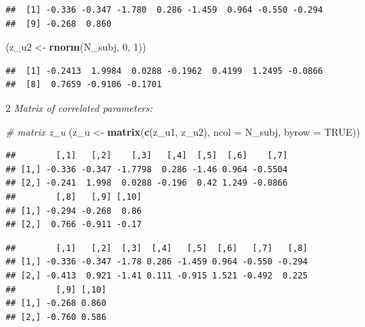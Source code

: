 \documentclass[12pt,]{krantz}
\newenvironment{Shaded}{\begin{snugshade}}{\end{snugshade}}
\newcommand{\CommentTok}[1]{\textcolor[rgb]{0.56,0.35,0.01}{\textit{#1}}}
\newcommand{\DataTypeTok}[1]{\textcolor[rgb]{0.13,0.29,0.53}{#1}}
\newcommand{\DecValTok}[1]{\textcolor[rgb]{0.00,0.00,0.81}{#1}}
\newcommand{\KeywordTok}[1]{\textcolor[rgb]{0.13,0.29,0.53}{\textbf{#1}}}
\newcommand{\NormalTok}[1]{#1}
\newcommand{\OperatorTok}[1]{\textcolor[rgb]{0.81,0.36,0.00}{\textbf{#1}}}
\newcommand{\OtherTok}[1]{\textcolor[rgb]{0.56,0.35,0.01}{#1}}
\newcommand{\StringTok}[1]{\textcolor[rgb]{0.31,0.60,0.02}{#1}}
\theoremstyle{definition}
\theoremstyle{definition}
\theoremstyle{definition}
\theoremstyle{remark}
\begin{document}
\begin{verbatim}
##  [1] -0.336 -0.347 -1.780  0.286 -1.459  0.964 -0.550 -0.294
##  [9] -0.268  0.860
\end{verbatim}

\begin{Shaded}
\begin{Highlighting}[]
\NormalTok{ (z_u2 <-}\StringTok{ }\KeywordTok{rnorm}\NormalTok{(N_subj, }\DecValTok{0}\NormalTok{, }\DecValTok{1}\NormalTok{))}
\end{Highlighting}
\end{Shaded}

\begin{verbatim}
##  [1] -0.2413  1.9984  0.0288 -0.1962  0.4199  1.2495 -0.0866
##  [8]  0.7659 -0.9106 -0.1701
\end{verbatim}

2 \emph{Matrix of correlated parameters:}

\begin{Shaded}
\begin{Highlighting}[]
\CommentTok{# matrix z_u}
\NormalTok{ (z_u <-}\StringTok{ }\KeywordTok{matrix}\NormalTok{(}\KeywordTok{c}\NormalTok{(z_u1, z_u2), }\DataTypeTok{ncol =}\NormalTok{ N_subj, }\DataTypeTok{byrow =} \OtherTok{TRUE}\NormalTok{))}
\end{Highlighting}
\end{Shaded}

\begin{verbatim}
##        [,1]   [,2]    [,3]   [,4]  [,5]  [,6]    [,7]
## [1,] -0.336 -0.347 -1.7798  0.286 -1.46 0.964 -0.5504
## [2,] -0.241  1.998  0.0288 -0.196  0.42 1.249 -0.0866
##        [,8]   [,9] [,10]
## [1,] -0.294 -0.268  0.86
## [2,]  0.766 -0.911 -0.17
\end{verbatim}

\begin{Shaded}
\end{Shaded}

\begin{verbatim}
##        [,1]   [,2]  [,3]  [,4]   [,5]  [,6]   [,7]   [,8]
## [1,] -0.336 -0.347 -1.78 0.286 -1.459 0.964 -0.550 -0.294
## [2,] -0.413  0.921 -1.41 0.111 -0.915 1.521 -0.492  0.225
##        [,9] [,10]
## [1,] -0.268 0.860
## [2,] -0.760 0.586
\end{verbatim}
\end{document}
